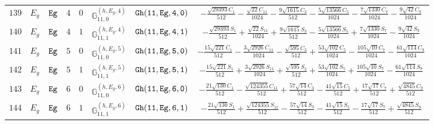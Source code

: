\documentclass[fleqn,8pt]{jsarticle}
\begin{document}
\begin{table}[ht!]
\begin{center}
\begin{tabular}{cccccccc}
$ 139 $ & $ E_{g} $ & $ {\tt Eg} $ & $ 4 $ & $ 0 $ & $ \mathbb{G}_{11,0}^{(h,E_{g},4)} $ & $ {\tt Gh(11,Eg,4,0)} $ & $ - \frac{\sqrt{29393} C_{1}}{512} - \frac{\sqrt{22} C_{11}}{1024} - \frac{9 \sqrt{1615} C_{3}}{512} - \frac{5 \sqrt{13566} C_{5}}{1024} - \frac{7 \sqrt{1330} C_{7}}{1024} - \frac{9 \sqrt{42} C_{9}}{1024} $ \\
$ 140 $ & $ E_{g} $ & $ {\tt Eg} $ & $ 4 $ & $ 1 $ & $ \mathbb{G}_{11,1}^{(h,E_{g},4)} $ & $ {\tt Gh(11,Eg,4,1)} $ & $ - \frac{\sqrt{29393} S_{1}}{512} + \frac{\sqrt{22} S_{11}}{1024} + \frac{9 \sqrt{1615} S_{3}}{512} - \frac{5 \sqrt{13566} S_{5}}{1024} + \frac{7 \sqrt{1330} S_{7}}{1024} - \frac{9 \sqrt{42} S_{9}}{1024} $ \\
$ 141 $ & $ E_{g} $ & $ {\tt Eg} $ & $ 5 $ & $ 0 $ & $ \mathbb{G}_{11,0}^{(h,E_{g},5)} $ & $ {\tt Gh(11,Eg,5,0)} $ & $ - \frac{15 \sqrt{221} C_{1}}{512} - \frac{3 \sqrt{2926} C_{11}}{1024} - \frac{\sqrt{595} C_{3}}{512} + \frac{53 \sqrt{102} C_{5}}{1024} - \frac{105 \sqrt{10} C_{7}}{1024} - \frac{61 \sqrt{114} C_{9}}{1024} $ \\
$ 142 $ & $ E_{g} $ & $ {\tt Eg} $ & $ 5 $ & $ 1 $ & $ \mathbb{G}_{11,1}^{(h,E_{g},5)} $ & $ {\tt Gh(11,Eg,5,1)} $ & $ - \frac{15 \sqrt{221} S_{1}}{512} + \frac{3 \sqrt{2926} S_{11}}{1024} + \frac{\sqrt{595} S_{3}}{512} + \frac{53 \sqrt{102} S_{5}}{1024} + \frac{105 \sqrt{10} S_{7}}{1024} - \frac{61 \sqrt{114} S_{9}}{1024} $ \\
$ 143 $ & $ E_{g} $ & $ {\tt Eg} $ & $ 6 $ & $ 0 $ & $ \mathbb{G}_{11,0}^{(h,E_{g},6)} $ & $ {\tt Gh(11,Eg,6,0)} $ & $ - \frac{21 \sqrt{130} C_{1}}{512} - \frac{\sqrt{124355} C_{11}}{512} + \frac{57 \sqrt{14} C_{3}}{512} - \frac{41 \sqrt{15} C_{5}}{512} + \frac{17 \sqrt{17} C_{7}}{512} + \frac{\sqrt{4845} C_{9}}{512} $ \\
$ 144 $ & $ E_{g} $ & $ {\tt Eg} $ & $ 6 $ & $ 1 $ & $ \mathbb{G}_{11,1}^{(h,E_{g},6)} $ & $ {\tt Gh(11,Eg,6,1)} $ & $ - \frac{21 \sqrt{130} S_{1}}{512} + \frac{\sqrt{124355} S_{11}}{512} - \frac{57 \sqrt{14} S_{3}}{512} - \frac{41 \sqrt{15} S_{5}}{512} - \frac{17 \sqrt{17} S_{7}}{512} + \frac{\sqrt{4845} S_{9}}{512} $ \\
 \hline \hline
\end{tabular}
\end{center}
\end{table}
\end{document}
